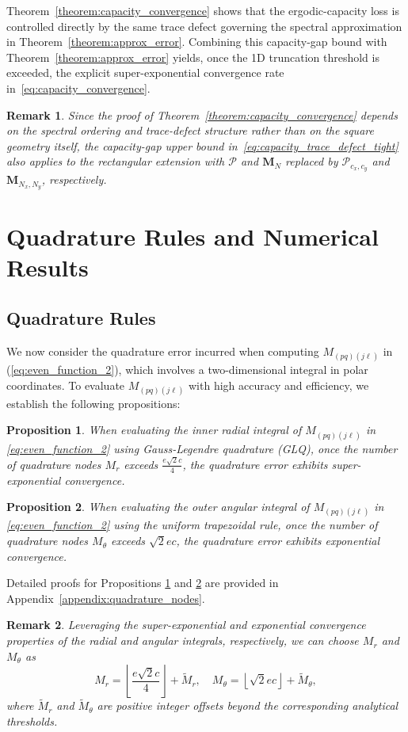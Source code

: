 \documentclass[lettersize,journal]{IEEEtran}
\theoremstyle{plain}
\newtheorem{remark}{Remark}
\newtheorem{proposition}{Proposition}
\begin{document}
Theorem~\ref{theorem:capacity_convergence} shows that the ergodic-capacity loss is controlled
directly by the same trace defect governing the spectral
approximation in Theorem~\ref{theorem:approx_error}.
Combining this capacity-gap bound with Theorem~\ref{theorem:approx_error} yields, once the 1D truncation threshold is exceeded, the explicit super-exponential convergence rate in~\eqref{eq:capacity_convergence}. 
\begin{remark}
	Since the proof of Theorem~\ref{theorem:capacity_convergence} depends on the spectral ordering and trace-defect structure rather than on the square geometry itself, the capacity-gap upper bound in~\eqref{eq:capacity_trace_defect_tight} also applies to the rectangular extension with $\mathcal{P}$ and  $\mathbf{M}_N$ replaced by $\mathcal{P}_{c_x, c_y}$ and $\mathbf{M}_{N_x, N_y}$, respectively.
\end{remark}

\section{Quadrature Rules and Numerical Results}
\label{sec:Quadrature Rules and Numerical Results}
\subsection{Quadrature Rules}
We now consider the quadrature error incurred when computing $M_{(pq)(j\ell)}$ in (\ref{eq:even_function_2}), which involves a two-dimensional integral in polar coordinates. To evaluate $M_{(pq)(j\ell)}$ with high accuracy and efficiency, we establish the following propositions:
\begin{proposition}
	\label{prop:radial_quadrature}
	When evaluating the inner radial integral of $M_{(pq)(j\ell)}$ in \eqref{eq:even_function_2} using Gauss-Legendre quadrature (GLQ), once the number of quadrature nodes $M_r$ exceeds $\frac{e\sqrt{2}c}{4}$, the quadrature error exhibits super-exponential convergence.
\end{proposition}
\begin{proposition}
	\label{prop:angular_quadrature}
	When evaluating the outer angular integral of $M_{(pq)(j\ell)}$ in \eqref{eq:even_function_2} using the uniform trapezoidal rule, once the number of quadrature nodes $M_{\theta}$ exceeds $\sqrt{2}ec$, the quadrature error exhibits exponential convergence.
\end{proposition}
Detailed proofs for Propositions \ref{prop:radial_quadrature} and \ref{prop:angular_quadrature} are provided in Appendix~\ref{appendix:quadrature_nodes}.
\begin{remark}
	Leveraging the super-exponential and exponential convergence properties of the radial and angular integrals, respectively, we can choose $M_r$ and $M_\theta$ as
	$$
		M_r = \left\lfloor \frac{e\sqrt{2}c}{4}\right\rfloor + \tilde{M}_r, \quad M_\theta = \left\lfloor \sqrt{2}ec\right\rfloor  + \tilde{M}_\theta,
	$$
	where $\tilde{M}_r$ and $\tilde{M}_\theta$ are positive integer offsets beyond the corresponding analytical thresholds.
\end{remark}
	
\end{document}
